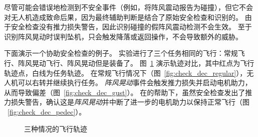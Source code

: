 尽管\deccheck 可能会错误地检测到不安全事件（例如，将阵风震动报告为碰撞），但它不会对无人机造成致命后果，因为最终辅助判断是结合了原始安全检查和\deccheck 识别的。
由于安全检查没有推力损失警告，因此识别碰撞的假阵风震动检测不会生效。
至于识别阵风晃动时误判坠机，只会触发降落或返回操作，不会导致额外的威胁。

 

下面演示一个\deccheck 协助安全检查的例子。
实验进行了三个任务相同的飞行：常规飞行、阵风晃动飞行、阵风晃动但是装备了\deccheck 。
图~\ref{fig:check_pedec_work} 演示轨迹对比，其中红点为飞行轨迹点，白线为任务轨迹。
在常规飞行情况下（图~\ref{fig:check_dec_regular}），无人机可以右转并继续执行任务。
\emph{阵风晃动}事件会触发推力损失并启动电机助力，从而导致偏差（图~\ref{fig:check_dec_gust}）。
在\deccheck 的帮助下，虽然安全检查发出了推力损失警告，\deccheck 确认这是\emph{阵风晃动}并中断了进一步的电机助力以保持正常飞行（图 ~\ref{fig:check_dec_pedec}）。

\begin{figure}[htb]
\caption{三种情况的飞行轨迹}
\label{fig:check_pedec_work} 
\end{figure}

